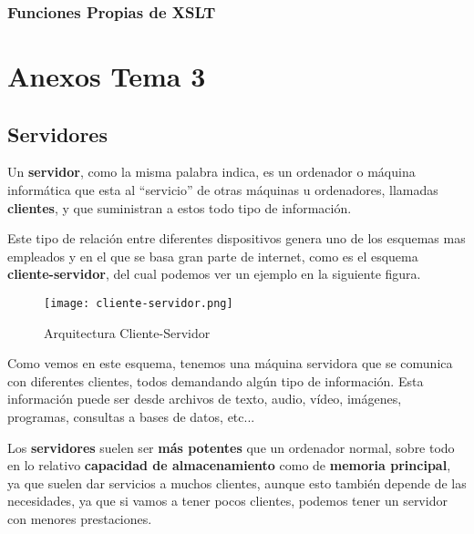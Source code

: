 \subsection{Funciones Propias de XSLT}

\appendix


\chapter{Anexos Tema 3}

\section{Servidores}
Un \textbf{servidor}, como la misma palabra indica, es un ordenador o máquina informática que esta al ``servicio'' de otras máquinas u ordenadores, llamadas \textbf{clientes}, y que suministran a estos todo tipo de información.

Este tipo de relación entre diferentes dispositivos genera uno de los esquemas mas empleados y en el que se basa gran parte de internet, como es el esquema \textbf{cliente-servidor}, del cual podemos ver un ejemplo en la siguiente figura.

\begin{figure}[H]
    \centering
    \texttt{[image: cliente-servidor.png]}
    \caption{Arquitectura Cliente-Servidor}
\end{figure}

Como vemos en este esquema, tenemos una máquina servidora que se comunica con diferentes clientes, todos demandando algún tipo de información. Esta información puede ser desde archivos de texto, audio, vídeo, imágenes, programas, consultas a bases de datos, etc...

Los \textbf{servidores} suelen ser \textbf{más potentes} que un ordenador normal, sobre todo en lo relativo  \textbf{capacidad de almacenamiento} como de \textbf{memoria principal}, ya que suelen dar servicios a muchos clientes, aunque esto también depende de las necesidades, ya que si vamos a tener pocos clientes, podemos tener un servidor con menores prestaciones.

